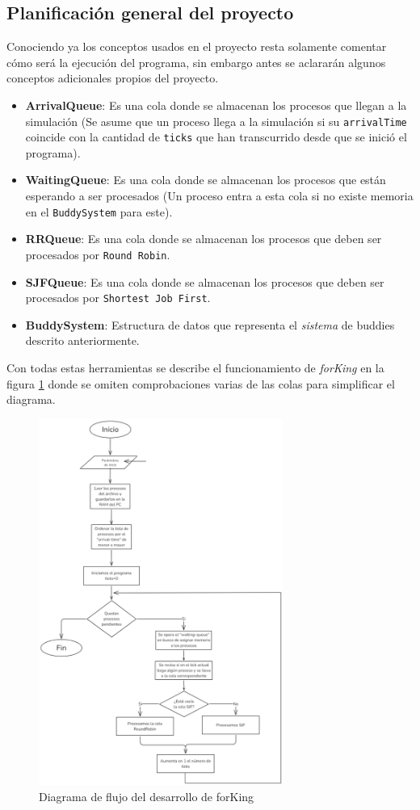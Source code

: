 \subsection{Planificación general del proyecto}
Conociendo ya los conceptos usados en el proyecto resta solamente comentar cómo será la ejecución del programa, sin embargo antes se aclararán algunos conceptos adicionales propios del proyecto.
\begin{itemize}
    \item \textbf{ArrivalQueue}: Es una cola donde se almacenan los procesos que llegan a la simulación (Se asume que un proceso llega a la simulación si su \texttt{arrivalTime} coincide con la cantidad de \texttt{ticks} que han transcurrido desde que se inició el programa).
    \item \textbf{WaitingQueue}: Es una cola donde se almacenan los procesos que están esperando a ser procesados (Un proceso entra a esta cola si no existe memoria en el \texttt{BuddySystem} para este).
    \item \textbf{RRQueue}: Es una cola donde se almacenan los procesos que deben ser procesados por \texttt{Round Robin}.
    \item \textbf{SJFQueue}: Es una cola donde se almacenan los procesos que deben ser procesados por \texttt{Shortest Job First}.
    \item \textbf{BuddySystem}: Estructura de datos que representa el \textit{sistema} de buddies descrito anteriormente.
\end{itemize}

Con todas estas herramientas se describe el funcionamiento de \textit{forKing} en la figura \ref{fig:flowchart} donde se omiten comprobaciones varias de las colas para simplificar el diagrama.

\begin{figure}[!ht]
    \centering
    \includegraphics[height=12cm]{src/figures/Diagrama de flujo.png}
    \caption{Diagrama de flujo del desarrollo de forKing}\label{fig:flowchart}
\end{figure}


